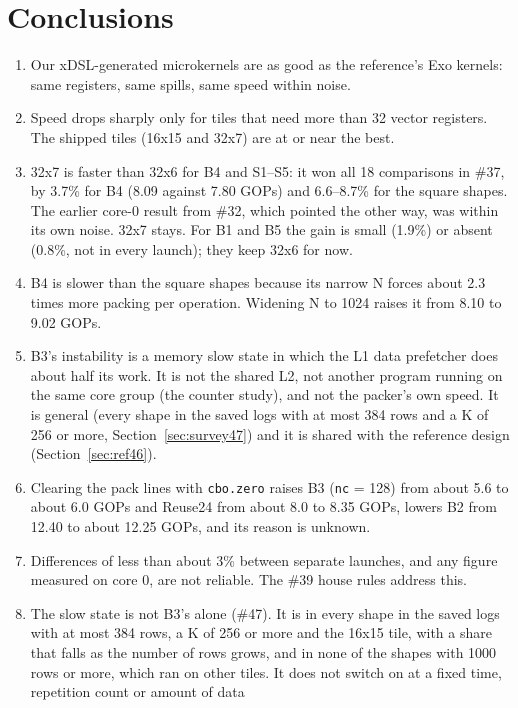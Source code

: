 \documentclass[11pt,a4paper]{article}
\begin{document}
\section{Conclusions}
\begin{enumerate}
  \item Our xDSL-generated microkernels are as good as the reference's Exo kernels: same registers, same spills,
  same speed within noise.
  \item Speed drops sharply only for tiles that need more than 32 vector registers. The shipped tiles (16x15 and
  32x7) are at or near the best.
  \item 32x7 is faster than 32x6 for B4 and S1--S5: it won all 18 comparisons in \#37, by 3.7\% for B4 (8.09
  against 7.80 GOPs) and 6.6--8.7\% for the square shapes. The earlier core-0 result from \#32, which pointed
  the other way, was within its own noise. 32x7 stays. For B1 and B5 the gain is small (1.9\%) or absent
  (0.8\%, not in every launch); they keep 32x6 for now.
  \item B4 is slower than the square shapes because its narrow N forces about 2.3 times more packing per
  operation. Widening N to 1024 raises it from 8.10 to 9.02 GOPs.
  \item B3's instability is a memory slow state in which the L1 data prefetcher does about half its work. It is
  not the shared L2, not another program running on the same core group (the counter study), and not the packer's own speed. It is
  general (every shape in the saved logs with at most 384 rows and a K of 256 or more, Section~\ref{sec:survey47}) and it is shared with
  the reference design (Section~\ref{sec:ref46}).
  \item Clearing the pack lines with \texttt{cbo.zero} raises B3 (\texttt{nc} = 128) from about 5.6 to about 6.0
  GOPs and Reuse24 from about 8.0 to 8.35 GOPs, lowers B2 from 12.40 to about 12.25 GOPs, and its reason is
  unknown.
  \item Differences of less than about 3\% between separate launches, and any figure measured on core 0, are not
  reliable. The \#39 house rules address this.
  \item The slow state is not B3's alone (\#47). It is in every shape in the saved logs with at most 384 rows, a K of
  256 or more and the 16x15 tile, with a share that falls as the number of rows grows, and in none of the shapes with 1000
  rows or more, which ran on other tiles. It does not switch on at a fixed time, repetition count or amount of data

\end{enumerate}
\end{document}
